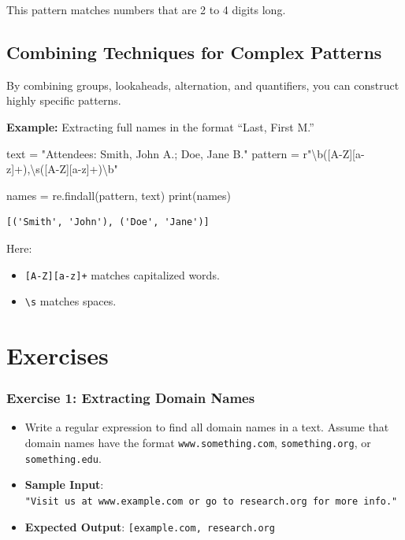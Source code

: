 \documentclass[
  letterpaper,
  DIV=11,
  numbers=noendperiod]{scrreprt}
\newenvironment{Shaded}{\begin{snugshade}}{\end{snugshade}}
\newcommand{\BuiltInTok}[1]{\textcolor[rgb]{0.00,0.23,0.31}{#1}}
\newcommand{\NormalTok}[1]{\textcolor[rgb]{0.00,0.23,0.31}{#1}}
\newcommand{\OperatorTok}[1]{\textcolor[rgb]{0.37,0.37,0.37}{#1}}
\newcommand{\StringTok}[1]{\textcolor[rgb]{0.13,0.47,0.30}{#1}}
\newcommand{\VerbatimStringTok}[1]{\textcolor[rgb]{0.13,0.47,0.30}{#1}}
\providecommand{\tightlist}{%
  \setlength{\itemsep}{0pt}\setlength{\parskip}{0pt}}\usepackage{longtable,booktabs,array}
\begin{document}
This pattern matches numbers that are 2 to 4 digits long.

\hypertarget{combining-techniques-for-complex-patterns}{%
\subsection{Combining Techniques for Complex
Patterns}\label{combining-techniques-for-complex-patterns}}

By combining groups, lookaheads, alternation, and quantifiers, you can
construct highly specific patterns.

\textbf{Example:} Extracting full names in the format ``Last, First M.''

\begin{Shaded}
\begin{Highlighting}[]
\NormalTok{text }\OperatorTok{=} \StringTok{"Attendees: Smith, John A.; Doe, Jane B."}
\NormalTok{pattern }\OperatorTok{=} \VerbatimStringTok{r"\textbackslash{}b([A{-}Z][a{-}z]+),\textbackslash{}s([A{-}Z][a{-}z]+)\textbackslash{}b"}

\NormalTok{names }\OperatorTok{=}\NormalTok{ re.findall(pattern, text)}
\BuiltInTok{print}\NormalTok{(names)  }
\end{Highlighting}
\end{Shaded}

\begin{verbatim}
[('Smith', 'John'), ('Doe', 'Jane')]
\end{verbatim}

Here:

\begin{itemize}
\tightlist
\item
  \texttt{{[}A-Z{]}{[}a-z{]}+} matches capitalized words.
\item
  \texttt{\textbackslash{}s} matches spaces.
\end{itemize}

\hypertarget{exercises-14}{%
\section{Exercises}\label{exercises-14}}

\hypertarget{exercise-1-extracting-domain-names}{%
\subsubsection{Exercise 1: Extracting Domain
Names}\label{exercise-1-extracting-domain-names}}

\begin{itemize}
\tightlist
\item
  Write a regular expression to find all domain names in a text. Assume
  that domain names have the format \texttt{www.something.com},
  \texttt{something.org}, or \texttt{something.edu}.
\item
  \textbf{Sample Input}:
  \texttt{"Visit\ us\ at\ www.example.com\ or\ go\ to\ research.org\ for\ more\ info."}
\item
  \textbf{Expected Output}:
  \texttt{{[}\textquotesingle{}example.com\textquotesingle{},\ \textquotesingle{}research.org\textquotesingle{}{]}}
\end{itemize}
\end{document}
